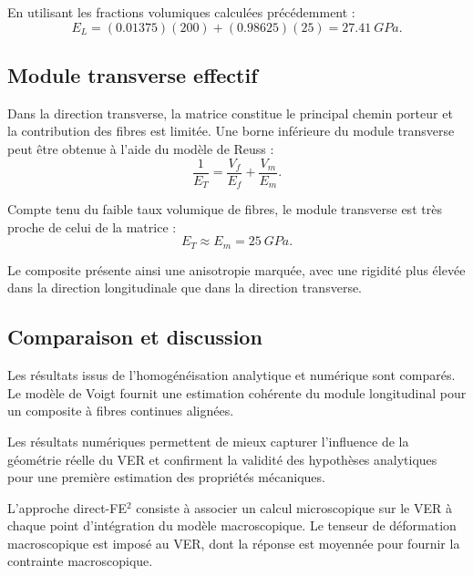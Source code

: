 \documentclass{rapportECL}
\begin{document}
En utilisant les fractions volumiques calculées précédemment :
\begin{equation}
E_L = (0.01375)(200) + (0.98625)(25) = \SI{27.41}{GPa}.
\end{equation}

\subsection{Module transverse effectif}

Dans la direction transverse, la matrice constitue le principal chemin porteur et la contribution des fibres est limitée. Une borne inférieure du module transverse peut être obtenue à l’aide du modèle de Reuss :
\begin{equation}
\frac{1}{E_T} = \frac{V_f}{E_f} + \frac{V_m}{E_m}.
\end{equation}

Compte tenu du faible taux volumique de fibres, le module transverse est très proche de celui de la matrice :
\begin{equation}
E_T \approx E_m = \SI{25}{GPa}.
\end{equation}

Le composite présente ainsi une anisotropie marquée, avec une rigidité plus élevée dans la direction longitudinale que dans la direction transverse.




\newpage
\subsection{Comparaison et discussion}

Les résultats issus de l’homogénéisation analytique et numérique sont comparés. Le modèle de Voigt fournit une estimation cohérente du module longitudinal pour un composite à fibres continues alignées.

Les résultats numériques permettent de mieux capturer l’influence de la géométrie réelle du VER et confirment la validité des hypothèses analytiques pour une première estimation des propriétés mécaniques.







L’approche direct-FE$^2$ consiste à associer un calcul microscopique sur le VER à chaque point d’intégration du modèle macroscopique. Le tenseur de déformation macroscopique est imposé au VER, dont la réponse est moyennée pour fournir la contrainte macroscopique.
\end{document}
